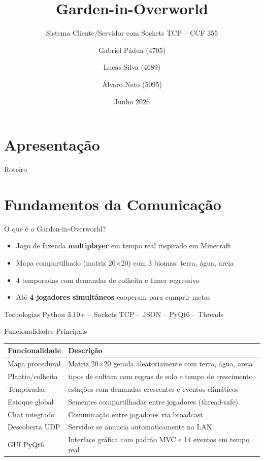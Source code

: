 \documentclass[aspectratio=169]{beamer}
\title{Garden-in-Overworld}
\subtitle{Sistema Cliente/Servidor com Sockets TCP -- CCF 355}
\author{Gabriel P\'adua (4705) \and Lucas Silva (4689) \and \'Alvaro Neto (5095)}
\institute{UFV -- Campus Florestal \\ Bacharelado em Ci\^encia da Computa\c{c}\~ao}
\date{Junho 2026}
\begin{document}
\section{Apresenta\c{c}\~ao}

\begin{frame}
  \titlepage
\end{frame}

\begin{frame}[shrink=10]{Roteiro}
  \tableofcontents
\end{frame}

\section{Fundamentos da Comunica\c{c}\~ao}

\begin{frame}{O que \'e o Garden-in-Overworld?}
  \begin{itemize}
    \item Jogo de fazenda \textbf{multiplayer} em tempo real inspirado em Minecraft
    \item Mapa compartilhado (matriz 20$\times$20) com 3 biomas: terra, \'agua, areia
    \item 4 temporadas com demandas de colheita e timer regressivo
    \item At\'e \textbf{4 jogadores simult\^aneos} cooperam para cumprir metas
  \end{itemize}
  \vfill
  \begin{exampleblock}{Tecnologias}
    Python 3.10+ -- Sockets TCP -- JSON -- PyQt6 -- Threads
  \end{exampleblock}
\end{frame}

\begin{frame}{Funcionalidades Principais}
  \footnotesize
  \begin{tabular}{>{\raggedright\arraybackslash}p{3.5cm}>{\raggedright\arraybackslash}p{9cm}}
    \toprule
    \textbf{Funcionalidade} & \textbf{Descri\c{c}\~ao} \\
    \midrule
    Mapa procedural & Matriz 20$\times$20 gerada aleatoriamente com terra, \'agua, areia \\
    Plantio/colheita & 6 tipos de cultura com regras de solo e tempo de crescimento \\
    Temporadas & 4 esta\c{c}\~oes com demandas crescentes e eventos clim\'aticos \\
    Estoque global & Sementes compartilhadas entre jogadores (thread-safe) \\
    Chat integrado & Comunica\c{c}\~ao entre jogadores via broadcast \\
    Descoberta UDP & Servidor se anuncia automaticamente na LAN \\
    GUI PyQt6 & Interface gr\'afica com padr\~ao MVC e 14 eventos em tempo real \\
    \bottomrule
  \end{tabular}
\end{frame}
\end{document}
